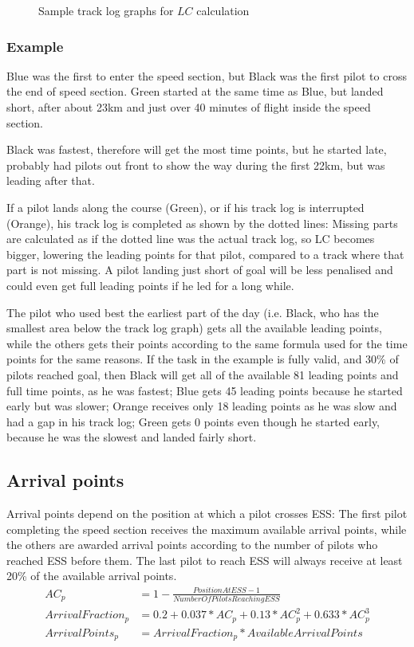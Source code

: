 \documentclass{article}
\begin{document}
\begin{figure}[h]
    \centering
    
    \caption{Sample track log graphs for \(LC\) calculation}
\end{figure}

\subsubsection{Example}
Blue was the first to enter the speed section, but Black was the first pilot to
cross the end of speed section. Green started at the same time as Blue, but
landed short, after about 23km and just over 40 minutes of flight inside the
speed section.

Black was fastest, therefore will get the most time points, but he started
late, probably had pilots out front to show the way during the first 22km, but
was leading after that.

If a pilot lands along the course (Green), or if his track log is interrupted
(Orange), his track log is completed as shown by the dotted lines: Missing
parts are calculated as if the dotted line was the actual track log, so LC
becomes bigger, lowering the leading points for that pilot, compared to a track
where that part is not missing. A pilot landing just short of goal will be less
penalised and could even get full leading points if he led for a long while.

The pilot who used best the earliest part of the day (i.e. Black, who has the
smallest area below the track log graph) gets all the available leading points,
while the others gets their points according to the same formula used for the
time points for the same reasons. If the task in the example is fully valid,
and 30\% of pilots reached goal, then Black will get all of the available 81
leading points and full time points, as he was fastest; Blue gets 45 leading
points because he started early but was slower; Orange receives only 18 leading
points as he was slow and had a gap in his track log; Green gets 0 points even
though he started early, because he was the slowest and landed fairly short.

\subsection{Arrival points}
\label{sec:arrival-points}
\begin{hg}
Arrival points depend on the position at which a pilot crosses ESS: The first
pilot completing the speed section receives the maximum available arrival
points, while the others are awarded arrival points according to the number of
pilots who reached ESS before them. The last pilot to reach ESS will always
receive at least 20\% of the available arrival points.
\begin{align*}
    AC_p &= 1 - \frac{PositionAtESS - 1}{NumberOfPilotsReachingESS} \\
    ArrivalFraction_p &= 0.2 + 0.037 * AC_p + 0.13 * AC_p^2 + 0.633 * AC_p^3 \\
    ArrivalPoints_p &= ArrivalFraction_p * AvailableArrivalPoints
\end{align*}
\end{hg}
\end{document}
